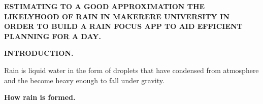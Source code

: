 \documentclass[12pt]{article}
\begin{document}


\vspace{\baselineskip}

\vspace{\baselineskip}

\vspace{\baselineskip}

\vspace{\baselineskip}

\vspace{\baselineskip}

\vspace{\baselineskip}

\vspace{\baselineskip}

\vspace{\baselineskip}

\vspace{\baselineskip}

\vspace{\baselineskip}

\vspace{\baselineskip}

\vspace{\baselineskip}
\begin{Center}
{\fontsize{13pt}{15.6pt}\selectfont \textbf{ESTIMATING TO A GOOD APPROXIMATION THE LIKELYHOOD OF RAIN IN MAKERERE UNIVERSITY IN ORDER TO BUILD A RAIN FOCUS APP TO AID EFFICIENT PLANNING FOR A DAY.}\par}
\end{Center}\par


\vspace{\baselineskip}
\begin{Center}
{\fontsize{13pt}{15.6pt}\selectfont \textbf{INTRODUCTION.}\par}
\end{Center}\par

{\fontsize{13pt}{15.6pt}\selectfont Rain is liquid water in the form of droplets that have condensed from atmosphere and the become heavy enough to fall under gravity.\par}\par


\vspace{\baselineskip}
{\fontsize{13pt}{15.6pt}\selectfont \textbf{How rain is formed.}\par}\par
\end{document}
